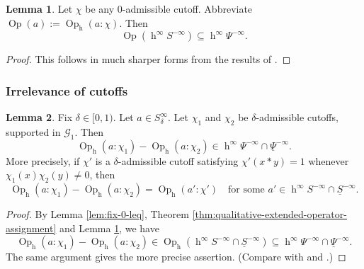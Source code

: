 \documentclass[reqno]{amsart}
\DeclareMathOperator{\h}{h}
\DeclareMathOperator{\Opp}{Op}
\theoremstyle{plain} \newtheorem{theorem} {Theorem}
\theoremstyle{definition} \newtheorem{definition} [theorem] {Definition}
\theoremstyle{itplain} %
\newtheorem{lemma}[theorem]{Lemma}
\numberwithin{equation}{section}
\numberwithin{theorem}{section}
\begin{document}
\begin{lemma}\label{lem:let-chi-be}
  Let $\chi$ be any $0$-admissible cutoff.  Abbreviate $\Opp(a) := \Opp_{\h}(a:\chi)$.  Then
  \begin{equation*}
    \Opp(\h^\infty S^{-\infty}) \subseteq \h^\infty \Psi^{-\infty}.
  \end{equation*}
\end{lemma}
\begin{proof}
  This follows in much sharper forms from the results of \cite[\S10]{2020arXiv201202187N}.
\end{proof}

\subsubsection{Irrelevance of cutoffs}
\begin{lemma}\label{lem:fix-delta-in-1}
  Fix $\delta \in [0,1)$.  Let $a \in S_\delta^\infty$.  Let $\chi_1$ and $\chi_2$ be $\delta$-admissible cutoffs, supported in $\mathcal{G}_1$.  Then
  \begin{equation}\label{eq:opp_h-opp_h-in}
    \Opp_{\h}(a:\chi_1) - \Opp_{\h}(a:\chi_2) \in \h^\infty \Psi^{-\infty} \cap \underline{\Psi }^{-\infty}.
  \end{equation}
  More precisely, if $\chi '$ is a $\delta$-admissible cutoff satisfying $\chi ' (x \ast y) = 1$ whenever $\chi_1(x) \chi_2(y) \neq 0$, then
  \begin{equation}\label{eq:opp_h-opp_h-=}
    \Opp_{\h}(a:\chi_1) - \Opp_{\h}(a:\chi_2) = \Opp_{\h}(a' : \chi ') \quad \text{for some $a' \in \h^\infty S^{-\infty} \cap \underline{S}^{-\infty}$.}
  \end{equation}
\end{lemma}
\begin{proof}
  By Lemma \ref{lem:fix-0-leq}, Theorem \ref{thm:qualitative-extended-operator-assignment} and Lemma \ref{lem:let-chi-be}, we have
  \begin{equation*}
    \Opp_{\h}(a:\chi_1) - \Opp_{\h}(a:\chi_2) \in \Opp_{\h}(\h^\infty S^{-\infty} \cap \underline{S}^{-\infty})
    \subseteq \h^\infty \Psi^{-\infty} \cap \underline{\Psi}^{-\infty}.
  \end{equation*}
  The same argument gives the more precise assertion.  (Compare with \cite[Lemma 10.7]{2020arXiv201202187N} and \cite[\S5.4]{nelson-venkatesh-1}.)
\end{proof}
\end{document}
